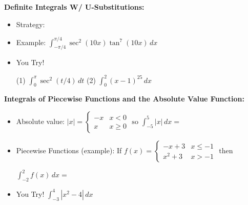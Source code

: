 \documentclass[12pt]{report}
\newcommand{\ds}{\displaystyle}
\begin{document}








\newpage


\noindent\textbf{Definite Integrals W/ U-Substitutions:}


\begin{itemize}

\item Strategy: %

\bigskip\bigskip

\item Example: $\ds \int_{-\pi/4}^{\pi/4} \sec^2(10x)\tan^7(10x) \, dx$

\vspace{1in}

\item You Try!

(1) $\ds \int_0^{\pi} \sec^2(t/4) \, dt$ \hspace{2in} (2) $\ds \int_0^2 (x-1)^{25} \, dx$

\vspace{1.5in}

\end{itemize}


\noindent\textbf{Integrals of Piecewise Functions and the Absolute Value Function:}

\begin{itemize}

\item Absolute value: $\ds |x| = \left\{ \begin{array}{cl} -x & x< 0 \\ x & x \geq 0 \end{array} \right. \text{   so   } \int_{-5}^5 |x| \, dx = $

\bigskip

\item Piecewise Functions (example): If $\ds f(x) = \left\{ \begin{array}{cl} -x+3 & x \leq -1 \\ x^2 + 3 & x > -1 \end{array} \right. \text{ then }$ 

\medskip

$\ds \int_{-2}^2 f(x) \, dx= $

\vspace{1in}

\item You Try! $\ds \int_{-3}^4 |x^2 - 4| \, dx$

\vspace{1.25in}


\end{itemize}
\end{document}
